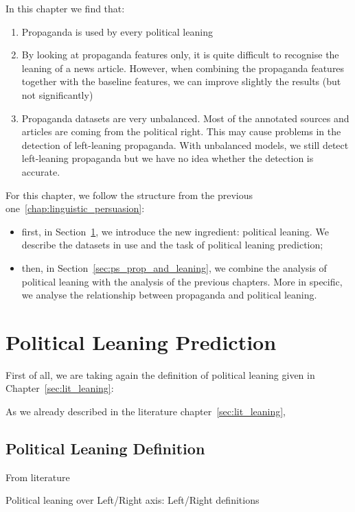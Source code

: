 In this chapter we find that:
\begin{enumerate}
    \item Propaganda is used by every political leaning
    \item By looking at propaganda features only, it is quite difficult to recognise the leaning of a news article. However, when combining the propaganda features together with the baseline features, we can improve slightly the results (but not significantly)
    \item Propaganda datasets are very unbalanced. Most of the annotated sources and articles are coming from the political right. This may cause problems in the detection of left-leaning propaganda. With unbalanced models, we still detect left-leaning propaganda but we have no idea whether the detection is accurate.
\end{enumerate}

For this chapter, we follow the structure from the previous one~\ref{chap:linguistic_persuasion}:
\begin{itemize}
    \item first, in Section~\ref{sec:ps_political_sides}, we introduce the new ingredient: political leaning. We describe the datasets in use and the task of political leaning prediction;
    \item then, in Section~\ref{sec:ps_prop_and_leaning}, we combine the analysis of political leaning with the analysis of the previous chapters. More in specific, we analyse the relationship between propaganda and political leaning.
\end{itemize}


\section{\statusred Political Leaning Prediction}
\label{sec:ps_political_sides}

First of all, we are taking again the definition of political leaning given in Chapter~\ref{sec:lit_leaning}: 

As we already described in the literature chapter~\ref{sec:lit_leaning}, 

\subsection{Political Leaning Definition}

From literature

Political leaning over Left/Right axis: Left/Right definitions

